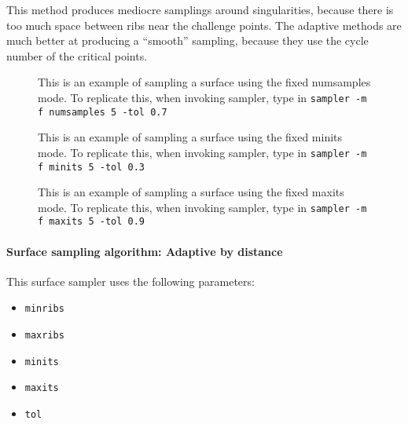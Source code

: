 This method produces mediocre samplings around singularities, because there is too much space between ribs near the challenge points.  The adaptive methods are much better at producing a ``smooth'' sampling, because they use the cycle number of the critical points.


\begin{figure}[!htb]\centering
     \caption{This is an example of sampling a surface using the fixed numsamples mode. To replicate this, when invoking sampler, type in {\tt sampler -m f numsamples 5 -tol 0.7}}
\end{figure}

\begin{figure}[!htb]\centering
     \caption{This is an example of sampling a surface using the fixed minits mode. To replicate this, when invoking sampler, type in {\tt sampler -m f minits 5 -tol 0.3}}
\end{figure}

\begin{figure}[!htb]\centering
     \caption{This is an example of sampling a surface using the fixed maxits mode. To replicate this, when invoking sampler, type in {\tt sampler -m f maxits 5 -tol 0.9}}
\end{figure}

\paragraph{Surface sampling algorithm: Adaptive by distance}

This surface sampler uses the following parameters:
\begin{itemize}[noitemsep]
  \item {\tt minribs}
  \item {\tt maxribs}
  \item {\tt minits}
  \item {\tt maxits}
  \item {\tt tol}
\end{itemize}


